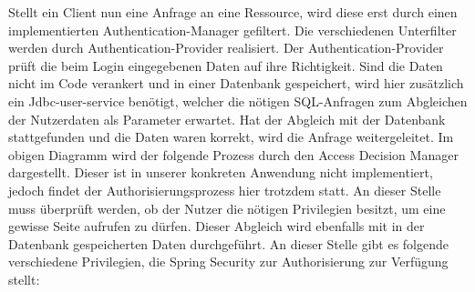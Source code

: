 Stellt ein Client nun eine Anfrage an eine Ressource, wird diese erst durch einen implementierten 
Authentication-Manager gefiltert. Die verschiedenen Unterfilter werden durch Authentication-Provider 
realisiert. Der Authentication-Provider prüft die beim Login eingegebenen Daten auf ihre Richtigkeit. 
Sind die Daten nicht im Code verankert und in einer Datenbank gespeichert, wird hier zusätzlich ein 
Jdbc-user-service benötigt, welcher die nötigen SQL-Anfragen zum Abgleichen der Nutzerdaten als 
Parameter erwartet. Hat der Abgleich mit der Datenbank stattgefunden und die Daten waren korrekt, wird 
die Anfrage weitergeleitet. Im obigen Diagramm wird der folgende Prozess durch den Access Decision 
Manager dargestellt. Dieser ist in unserer konkreten Anwendung nicht implementiert, jedoch findet der 
Authorisierungsprozess hier trotzdem statt. An dieser Stelle muss überprüft werden, ob der Nutzer die 
nötigen Privilegien besitzt, um eine gewisse Seite aufrufen zu dürfen. Dieser Abgleich wird ebenfalls 
mit in der Datenbank gespeicherten Daten durchgeführt. An dieser Stelle gibt es folgende verschiedene 
Privilegien, die Spring Security zur Authorisierung zur Verfügung stellt: \newpage

